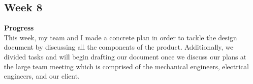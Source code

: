 \documentclass[onecolumn, oneside, letterpaper, draftclsnofoot, 10pt, compsoc]{IEEEtran}
\begin{document}

\subsection{Week 8}
\noindent \textbf{Progress}\\
 This week, my team and I made a concrete plan in order to tackle the design document by discussing all the components of the product. Additionally, we divided tasks and will begin drafting our document once we discuss our plans at the large team meeting which is comprised of the mechanical engineers, electrical engineers, and our client.
\end{document}
